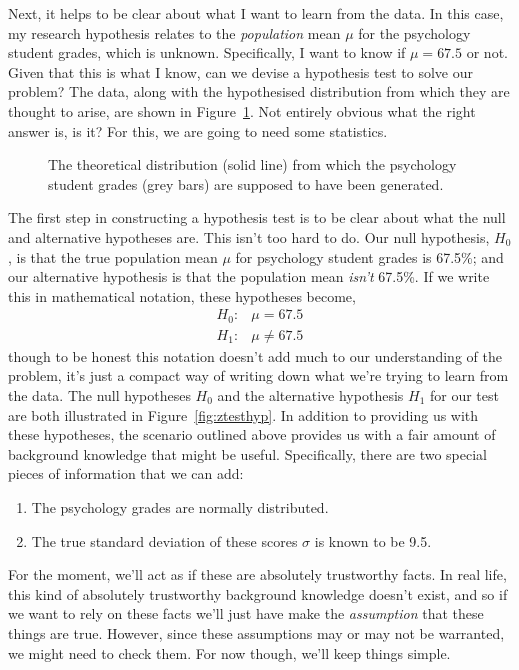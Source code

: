 Next, it helps to be clear about what I want to learn from the data. In this case, my research hypothesis relates to the {\it population} mean $\mu$ for the psychology student grades, which is unknown. Specifically, I want to know if $\mu = 67.5$ or not. Given that this is what I know, can we devise a hypothesis test to solve our problem? The data, along with the hypothesised distribution from which they are thought to arise, are shown in Figure~\ref{fig:zeppo}. Not entirely obvious what the right answer is, is it? For this, we are going to need some statistics.

\begin{figure}
\begin{center}
\caption{The theoretical distribution (solid line) from which the psychology student grades (grey bars) are supposed to have been generated.}
\HR
\label{fig:zeppo}
\end{center}
\end{figure}



The first step in constructing a hypothesis test is to be clear about what the null and alternative hypotheses are. This isn't too hard to do. Our null hypothesis, $H_0$, is that the true population mean $\mu$ for psychology student grades is 67.5\%; and our alternative hypothesis is that the population mean {\it isn't} 67.5\%. If we write this in mathematical notation, these hypotheses become,
$$
\begin{array}{ll}
H_0: & \mu = 67.5 \\
H_1: & \mu \neq 67.5
\end{array}
$$
though to be honest this notation doesn't add much to our understanding of the problem, it's just a compact way of writing down what we're trying to learn from the data. The null hypotheses $H_0$ and the alternative hypothesis $H_1$ for our test are both illustrated in Figure~\ref{fig:ztesthyp}. In addition to providing us with these hypotheses, the scenario outlined above provides us with a fair amount of background knowledge that might be useful. Specifically, there are two special pieces of information that we can add:
\begin{enumerate}
\item The psychology grades are normally distributed.
\item The true standard deviation of these scores $\sigma$ is known to be 9.5.
\end{enumerate}
For the moment, we'll act as if these are absolutely trustworthy facts. In real life, this kind of absolutely trustworthy background knowledge doesn't exist, and so if we want to rely on these facts we'll just have make the {\it assumption} that these things are true. However, since these assumptions may or may not be warranted, we might need to check them. For now though, we'll keep things simple.


